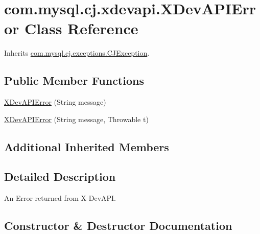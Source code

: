 \hypertarget{classcom_1_1mysql_1_1cj_1_1xdevapi_1_1_x_dev_a_p_i_error}{}\section{com.\+mysql.\+cj.\+xdevapi.\+X\+Dev\+A\+P\+I\+Error Class Reference}
\label{classcom_1_1mysql_1_1cj_1_1xdevapi_1_1_x_dev_a_p_i_error}


Inherits \mbox{\hyperlink{classcom_1_1mysql_1_1cj_1_1exceptions_1_1_c_j_exception}{com.\+mysql.\+cj.\+exceptions.\+C\+J\+Exception}}.

\subsection*{Public Member Functions}
\begin{DoxyCompactItemize}
\item 
\mbox{\hyperlink{classcom_1_1mysql_1_1cj_1_1xdevapi_1_1_x_dev_a_p_i_error_a61748bc5d161aef562084a9225c0aa5f}{X\+Dev\+A\+P\+I\+Error}} (String message)
\item 
\mbox{\hyperlink{classcom_1_1mysql_1_1cj_1_1xdevapi_1_1_x_dev_a_p_i_error_a243e94b6be20401c3a4ff7a9dc472a9c}{X\+Dev\+A\+P\+I\+Error}} (String message, Throwable t)
\end{DoxyCompactItemize}
\subsection*{Additional Inherited Members}


\subsection{Detailed Description}
An Error returned from X Dev\+A\+PI. 

\subsection{Constructor \& Destructor Documentation}
\mbox{\label{classcom_1_1mysql_1_1cj_1_1xdevapi_1_1_x_dev_a_p_i_error_a61748bc5d161aef562084a9225c0aa5f}} 
